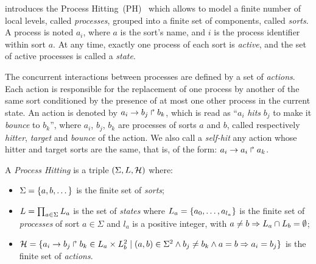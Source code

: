 

 introduces the Process Hitting~(PH)~\cite{PMR10-TCSB}
which allows to model a finite number of local levels,
called \emph{processes},
grouped into a finite set of components, called \emph{sorts}.
A process is noted $a_i$, where $a$ is the sort's name,
and $i$ is the process identifier within sort $a$.
At any time, exactly one process of each sort is \emph{active},
and the set of active processes is called a \emph{state}.

The concurrent interactions between processes are defined by a set of \emph{actions}.
Each action is responsible for the replacement of one process by another of the same sort
conditioned by the presence of at most one other process in the current state.
An action is denoted by $a_i\rightarrow b_j\Rsh b_k$, which is read as
“$a_i$ \emph{hits} $b_j$ to make it \emph{bounce} to $b_k$”,
where $a_i$, $b_j$, $b_k$ are processes of sorts $a$ and $b$,
called respectively \emph{hitter}, \emph{target} and
\emph{bounce} of the action.
We also call a \emph{self-hit} any action whose hitter and target sorts are the same,
that is, of the form: $a_i\rightarrow a_i\Rsh a_k$.

%

\begin{definition}\label{def:PH}
  A \emph{Process Hitting} is a triple $(\Sigma,L,\mathcal{H})$ where:
  \begin{itemize}
    \item  $\Sigma = \{a,b,\dots\}$ is the finite set of \emph{sorts};
    \item  $L = \prod_{a\in\Sigma} L_a$ is the set of \emph{states} where
      $L_a = \{a_0,\dots,a_{l_a}\}$
      is the finite set of \emph{processes} of sort $a\in\Sigma$
      and $l_a$ is a positive integer, with $a\neq b\Rightarrow L_a \cap L_b = \emptyset$;
    \item  $\mathcal{H} = \{ a_i\rightarrow b_j\Rsh b_k \in L_a \times L_b^2 \mid
      (a,b) \in \Sigma^2 \wedge b_j\neq b_k \wedge a=b\Rightarrow a_i=b_j\}$
      is the finite set of \emph{actions}.
  \end{itemize}
\end{definition}

